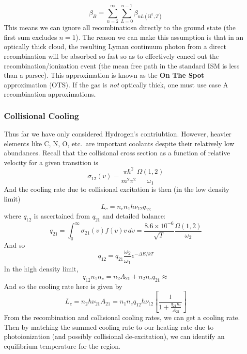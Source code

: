 \documentclass[10pt]{article}
\numberwithin{equation}{section}
\begin{document}
\begin{equation}
  \label{eq:h2:15} \beta_B =
  \sum_{n=2}^{\infty}\sum_{L=0}^{n-1}\beta_{nL(\mathrm{H}^0, T)}
\end{equation}
This means we can ignore all recombinatiosn directly to the ground state (the
first sum excludes $n=1$). The reason we can make this assumption is that in an
optically thick cloud, the resulting Lyman continuum photon from a direct
recombination will be absorbed so fast so as to effectively cancel out the
recombination/ionization event (the mean free path in the standard ISM is less
than a parsec). This approximation is known as the \textbf{On The Spot}
approximation (OTS). If the gas is \emph{not} optically thick, one must use
case A recombination approximations.
\subsubsection{Collisional Cooling} %
\label{ssub:collisional_cooling}
Thus far we have only considered Hydrogen's contriubtion. However, heavier
elements like C, N, O, etc.\ are important coolants despite their relatively
low abundances. Recall that the collisional cross section as a function of
relative velocity for a given transition is
\begin{equation}
  \label{eq:h2:16} \sigma_{12}(v) = \frac{\pi
  \hbar^2}{m^2v^2}\frac{\Omega(1,2)}{\omega_1}
\end{equation}
And the cooling rate due to collisional excitation is then (in the low density
limit)
\begin{equation}
  \label{eq:h2:17}L_c= n_e n_1 h\nu_{12}q_{12}
\end{equation}
where $q_{12}$ is ascertained from $q_{21}$ and detailed balance:
\begin{equation}
  \label{eq:h2:18} q_{21} = \int_0^\infty \sigma_{21}(v)f(v)v\,dv =
  \frac{8.6\times 10^{-6}}{\sqrt{T}}\frac{\Omega(1,2)}{\omega_{2}}
\end{equation}
And so
\begin{equation}
  \label{eq:h2:19} q_{12} = q_{21} \frac{\omega_2}{\omega_1} e^{-\Delta E / kT}
\end{equation}
In the high density limit, 
\begin{equation}
  \label{eq:h2:20} q_{12}n_1n_e = n_2 A_{21} + n_2 n_e q_{21} \approx
\end{equation}
And so the cooling rate here is given by
\begin{equation}
  \label{eq:h2:21} L_c=n_2 h\nu_{21}A_{21} = n_1 n_e q_{12} h\nu_{12} \left[
  \frac{1}{1 + \frac{q_{21}n_e}{A_{21}}}\right]
\end{equation}
From the recombination and collisional cooling rates, we can get a cooling
rate. Then by matching the summed cooling rate to our heating rate due to
photoionization (and possibly collisional de-excitation), we can identify an
equilibrium temperature for the region.
\end{document}

